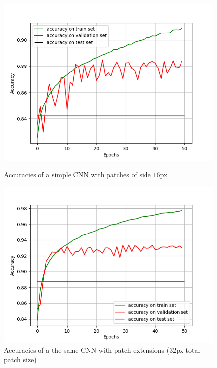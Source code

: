 \documentclass[10pt,conference,compsocconf]{IEEEtran}
\begin{document}
\begin{figure}[h]
	\centering
	\begin{minipage}[b]{0.48\linewidth}
		\includegraphics[width=\textwidth]{CNN_with_border_0.png}
		\captionsetup{aboveskip=0.4cm,justification=centering, margin=0.1cm, labelfont=footnotesize, textfont=footnotesize}
		\caption{Accuracies of a simple CNN with patches of side $16$px}
		\label{fig:noExtensions}
	\end{minipage}
	\hspace{0.05cm}
	\begin{minipage}[b]{0.48\linewidth}
		\includegraphics[width=\textwidth]{CNN_with_border_16.png}
		\captionsetup{aboveskip=0.1cm,justification=centering, margin=0.1cm, labelfont=footnotesize, textfont=footnotesize}
		\caption{Accuracies of a the same CNN with patch extensions ($32$px total patch size)}
		\label{fig:extensions}
	\end{minipage}
\end{figure}
\end{document}
